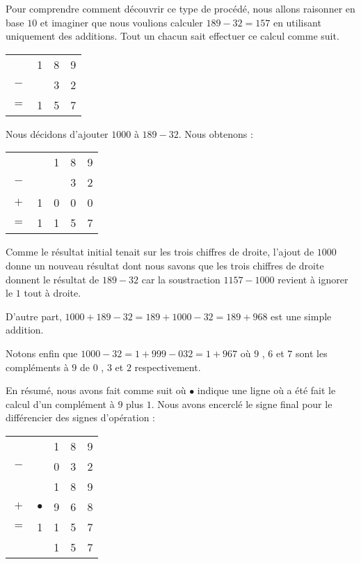 Pour comprendre comment découvrir ce type de procédé, nous allons raisonner en base $10$ et imaginer que nous voulions calculer $189 - 32 = 157$ en utilisant uniquement des additions. Tout un chacun sait effectuer ce calcul comme suit.
\begin{center}
\begin{tabular}{cccc}
	    & 1 & 8 & 9 \\
	$-$ &   & 3 & 2 \\
	\hline
    $=$ & 1 & 5 & 7 \\
\end{tabular}
\end{center}
Nous décidons d'ajouter $1000$ à $189 - 32$. Nous obtenons :
\begin{center}
\begin{tabular}{ccccc}
	    &   & 1 & 8 & 9 \\
	$-$ &   &   & 3 & 2 \\
	$+$ & 1 & 0 & 0 & 0 \\
	\hline
    $=$ & 1 & 1 & 5 & 7 \\
\end{tabular}
\end{center}
Comme le résultat initial tenait sur les trois chiffres de droite, l'ajout de $1000$ donne un nouveau résultat dont nous savons que les trois chiffres de droite donnent le résultat de $189 - 32$ car la soustraction $1157 - 1000$ revient à ignorer le $1$ tout à droite.

\smallskip

D'autre part, $1000 + 189 - 32 = 189 + 1000 - 32 = 189 + 968$ est une simple addition.

\smallskip

Notons enfin que $1000 - 32 = 1 + 999 - 032 = 1 + 967$ où $9$ , $6$ et $7$ sont les compléments à $9$ de $0$ , $3$ et $2$ respectivement.

\smallskip

En résumé, nous avons fait comme suit où $\bullet$ indique une ligne où a été fait le calcul d'un complément à $9$ plus $1$. Nous avons encerclé le signe final pour le différencier des signes d'opération :

\begin{center}
\begin{tabular}{ccccc}
	    &           & 1 & 8 & 9 \\
	$-$ &           & 0 & 3 & 2 \\
	\hline
	\hline
	    &           & 1 & 8 & 9 \\
	$+$ & $\bullet$ & 9 & 6 & 8 \\
	\hline
    $=$ & 1         & 1 & 5 & 7 \\
	\hline
	\hline
        & \sign{+}  & 1 & 5 & 7 \\
\end{tabular}
\end{center}

